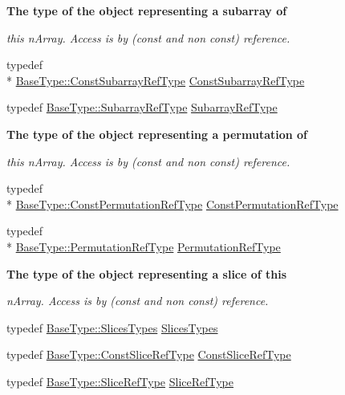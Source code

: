 \begin{Indent}{\bf The type of the object representing a subarray of}\par
{\em this n\-Array. Access is by (const and non const) reference. }\begin{DoxyCompactItemize}
\item 
typedef \\*
\hyperlink{classvct_dynamic_const_n_array_base_a4b3508630e409eda4f0d2f55d17d89a4}{Base\-Type\-::\-Const\-Subarray\-Ref\-Type} \hyperlink{classvct_dynamic_n_array_base_a022316a8c3f976026301c5da668d1fb4}{Const\-Subarray\-Ref\-Type}
\item 
typedef \hyperlink{classvct_dynamic_const_n_array_base_a4db8630795191b1854a5af85b9327ee3}{Base\-Type\-::\-Subarray\-Ref\-Type} \hyperlink{classvct_dynamic_n_array_base_a473d1fefa0debae5d9f6b0cd3a05f269}{Subarray\-Ref\-Type}
\end{DoxyCompactItemize}
\end{Indent}
\begin{Indent}{\bf The type of the object representing a permutation of}\par
{\em this n\-Array. Access is by (const and non const) reference. }\begin{DoxyCompactItemize}
\item 
typedef \\*
\hyperlink{classvct_dynamic_const_n_array_base_a412fcb88d50ea2e1d809efab113968fc}{Base\-Type\-::\-Const\-Permutation\-Ref\-Type} \hyperlink{classvct_dynamic_n_array_base_a8e5f4edd6bbaaa0650c24f464a5c13b6}{Const\-Permutation\-Ref\-Type}
\item 
typedef \\*
\hyperlink{classvct_dynamic_const_n_array_base_a968acf814b972b47aa2ea39105e67fb3}{Base\-Type\-::\-Permutation\-Ref\-Type} \hyperlink{classvct_dynamic_n_array_base_a32a4177a0764b9b796ed4c41fbd8c2ad}{Permutation\-Ref\-Type}
\end{DoxyCompactItemize}
\end{Indent}
\begin{Indent}{\bf The type of the object representing a slice of this}\par
{\em n\-Array. Access is by (const and non const) reference. }\begin{DoxyCompactItemize}
\item 
typedef \hyperlink{classvct_dynamic_const_n_array_base_a1f4ce8ed9fda0d5d1704f66799a55279}{Base\-Type\-::\-Slices\-Types} \hyperlink{classvct_dynamic_n_array_base_a4f034b6fdba4c573c4f5da7cb913fb54}{Slices\-Types}
\item 
typedef \hyperlink{classvct_dynamic_const_n_array_base_ad4a09eb0789ba4c5b8d799fbe0ee3d79}{Base\-Type\-::\-Const\-Slice\-Ref\-Type} \hyperlink{classvct_dynamic_n_array_base_ac83089be31d75a0a4c8ef603506f820f}{Const\-Slice\-Ref\-Type}
\item 
typedef \hyperlink{classvct_dynamic_const_n_array_base_a4170184942c320b2402ba8dfdab9a915}{Base\-Type\-::\-Slice\-Ref\-Type} \hyperlink{classvct_dynamic_n_array_base_aca69a8c3c62f1db0703198aa955d6157}{Slice\-Ref\-Type}
\end{DoxyCompactItemize}
\end{Indent}
